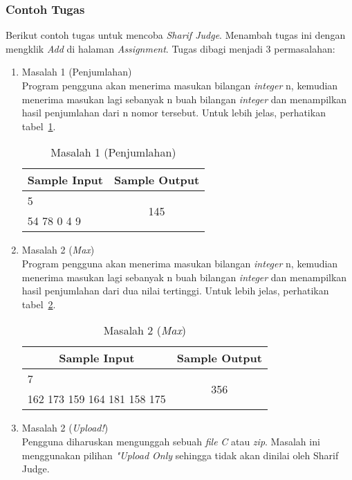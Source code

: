 \subsubsection{Contoh Tugas}

Berikut contoh tugas untuk mencoba \textit{Sharif Judge}. Menambah tugas ini dengan mengklik \textit{Add} di halaman \textit{Assignment}. Tugas dibagi menjadi 3 permasalahan:
\begin{enumerate}
	\item Masalah 1 (Penjumlahan) \\
	Program pengguna akan menerima masukan bilangan \textit{integer} n, kemudian menerima masukan lagi sebanyak n buah bilangan \textit{integer} dan menampilkan hasil penjumlahan dari n nomor tersebut. Untuk lebih jelas, perhatikan tabel~\ref{tab:tablesum}.
	
	\begin{table}[H] %
		\centering 
		\caption{Masalah 1 (Penjumlahan)}
		\label{tab:tablesum}
		\begin{tabular}{cc}
			\toprule
			Sample Input & Sample Output\\
			
			\midrule
			\multicolumn{1}{l}{5} & \multirow{2}{*}{145}\\
			\multicolumn{1}{l}{54 78 0 4 9} & \\
			
			\bottomrule
			
		\end{tabular} 
	\end{table}
	
	\item Masalah 2 (\textit{Max}) \\
	Program pengguna akan menerima masukan bilangan \textit{integer} n, kemudian menerima masukan lagi sebanyak n buah bilangan \textit{integer} dan menampilkan hasil penjumlahan dari dua nilai tertinggi. Untuk lebih jelas, perhatikan tabel~\ref{tab:tablemax}.
	
	\begin{table}[H] %
		\centering 
		\caption{Masalah 2 (\textit{Max})}
		\label{tab:tablemax}
		\begin{tabular}{cc}
			\toprule
			Sample Input & Sample Output\\
			
			\midrule
			\multicolumn{1}{l}{7} & \multirow{2}{*}{356}\\
			\multicolumn{1}{l}{162 173 159 164 181 158 175} & \\
			
			\bottomrule
			
		\end{tabular} 
	\end{table}
	
	\item Masalah 2 (\textit{Upload!}) \\
	Pengguna diharuskan mengunggah sebuah \textit{file} \textit{C} atau \textit{zip}. Masalah ini menggunakan pilihan \textit{"Upload Only} sehingga tidak akan dinilai oleh Sharif Judge.
\end{enumerate}

